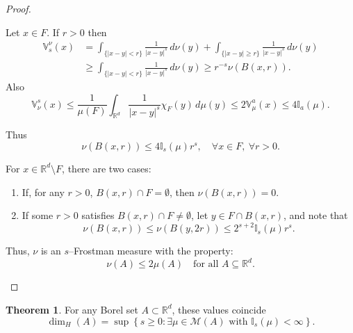 \documentclass[12pt,a4paper]{report}
\theoremstyle{definition}
\newtheorem{theorem}{Theorem}
\begin{document}
\begin{proof}
\begin{enumerate}
Let $x \in F$. If $r > 0$ then
\begin{align*}
\mathbb{V}^\nu_s(x) &= \int_{\{|x - y| < r\}} \frac{1}{|x - y|^s} \, d\nu(y)
+ \int_{\{|x - y| \ge r\}} \frac{1}{|x - y|^s} \, d\nu(y) \\
&\ge \int_{\{|x - y| < r\}} \frac{1}{|x - y|^s} \, d\nu(y)
\ge r^{-s} \nu(B(x, r)).
\end{align*}
Also
\[
\mathbb{V}^s_\nu(x) \le \frac{1}{\mu(F)} \int_{\mathbb{R}^d} \frac{1}{|x - y|^s} \chi_F(y) \, d\mu(y)
\le 2 \mathbb{V}^a_\mu(x) \le 4 \mathbb{I}_a(\mu).
\]

\noindent
Thus
\[
\nu(B(x, r)) \le 4 \mathbb{I}_s(\mu) r^s, \quad \forall x \in F, \ \forall r > 0.
\]

\noindent
For $x \in \mathbb{R}^d \setminus F$, there are two cases:

\begin{enumerate}
\item If, for any $r > 0$, $B(x, r) \cap F = \emptyset$, then $\nu(B(x, r)) = 0$.
\item If some $r > 0$ satisfies $B(x, r) \cap F \ne \emptyset$, let $y \in F \cap B(x, r)$, and note that
\[
\nu(B(x, r)) \le \nu(B(y, 2r)) \le 2^{s + 2} \mathbb{I}_s(\mu) r^s.
\]
\end{enumerate}

\noindent
Thus, $\nu$ is an $s$–Frostman measure with the property:
\[
\nu(A) \le 2 \mu(A) \quad \text{for all } A \subseteq \mathbb{R}^d.
\]
\end{enumerate}
\end{proof}

\begin{theorem} \label{thm2.8}
For any Borel set \( A \subset \mathbb{R}^d \), these values coincide
\[
\dim_H(A) = \sup \left\{ s \geq 0 : \exists \mu \in \mathcal{M}(A) \text{ with } \mathbb{I}_s(\mu) < \infty \right\}.
\]
\end{theorem}
\end{document}
